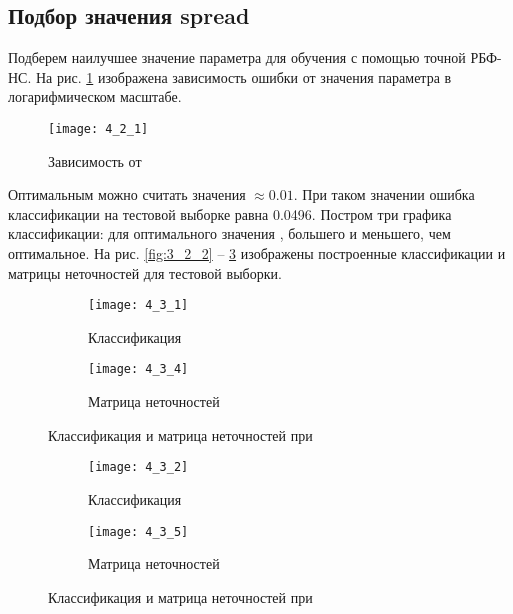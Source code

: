 \subsection{Подбор значения spread}


Подберем наилучшее значение параметра  для обучения с помощью точной РБФ-НС. На рис. \ref{fig:4_2_1} изображена зависимость ошибки  от значения параметра  в логарифмическом масштабе. 
\begin{figure}[H]
\begin{center}
	\texttt{[image: 4\_2\_1]}
	\caption{Зависимость  от }
	\label{fig:4_2_1}
\end{center}
\end{figure}

Оптимальным можно считать значения  $\approx 0.01$. При таком значении ошибка классификации на тестовой выборке равна 0.0496. Постром три графика классификации: для оптимального значения , большего и меньшего, чем оптимальное. На рис. \ref{fig:3_2_2} -- \ref{fig:3_2_4} изображены построенные классификации и матрицы неточностей для тестовой выборки. 
\begin{figure}[H]
\begin{center}
	\begin{subfigure}{0.49\textwidth}
		\texttt{[image: 4\_3\_1]}
		\caption{Классификация}
	\end{subfigure}
	\begin{subfigure}{0.49\textwidth}
		\texttt{[image: 4\_3\_4]}
		\caption{Матрица неточностей}
	\end{subfigure}
	\caption{Классификация и матрица неточностей при }
	\label{fig:3_2_4}
\end{center}
\end{figure}

\begin{figure}[H]
\begin{center}
	\begin{subfigure}{0.49\textwidth}
		\texttt{[image: 4\_3\_2]}
		\caption{Классификация}
	\end{subfigure}
	\begin{subfigure}{0.49\textwidth}
		\texttt{[image: 4\_3\_5]}
		\caption{Матрица неточностей}
	\end{subfigure}
	\caption{Классификация и матрица неточностей при }
	\label{fig:3_2_4}
\end{center}
\end{figure}

